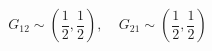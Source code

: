 \begin{equation}
G_{12} \sim (\frac{1}{2},\frac{1}{2}),~~~~~G_{21} \sim 
(\frac{1}{2},\frac{1}{2})
\end{equation}

